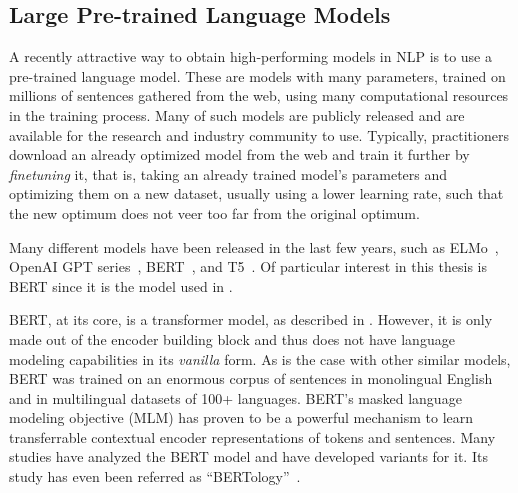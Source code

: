 
\subsection{Large Pre-trained Language Models}
\label{sec:pretrained-bg}

\noindent A recently attractive way to obtain high-performing models in NLP is
to use a pre-trained language model. These are models with many
parameters, trained on millions of sentences gathered from
the web, using many computational resources in the training process.
Many of such models are publicly released and are
available for the research and industry community to use. Typically,
practitioners download an already optimized model from the web and
train it further by \textit{finetuning} it, that is, taking an
already trained model's parameters and optimizing them on a new
dataset, usually using a lower learning rate, such that the new
optimum does not veer too far from the original optimum.

Many different models have been released in the last few years, such
as ELMo~\citep{peters2018deep}, OpenAI GPT
series~\citep{radford2018improving, brown2020language},
BERT~\citep{devlin2018bert}, and
T5~\citep{raffel2020Exploringlimitstransfer}. Of particular interest
in this thesis is BERT since it is the model used in
.

BERT, at its core, is a transformer model, as described in
. However, it is only made out of the
encoder building block and thus does not have language modeling
capabilities in its \textit{vanilla} form. As is the case with other
similar models, BERT was trained on an enormous corpus of sentences
in monolingual English and in multilingual datasets of 100+
languages. BERT's masked language modeling objective (MLM) has proven
to be a powerful mechanism to learn transferrable contextual encoder
representations of tokens and sentences. Many studies have analyzed
the BERT model and have developed variants for it. Its study has even
been referred as ``BERTology''~\citep{rogers2020PrimerBERTologyWhat}.
